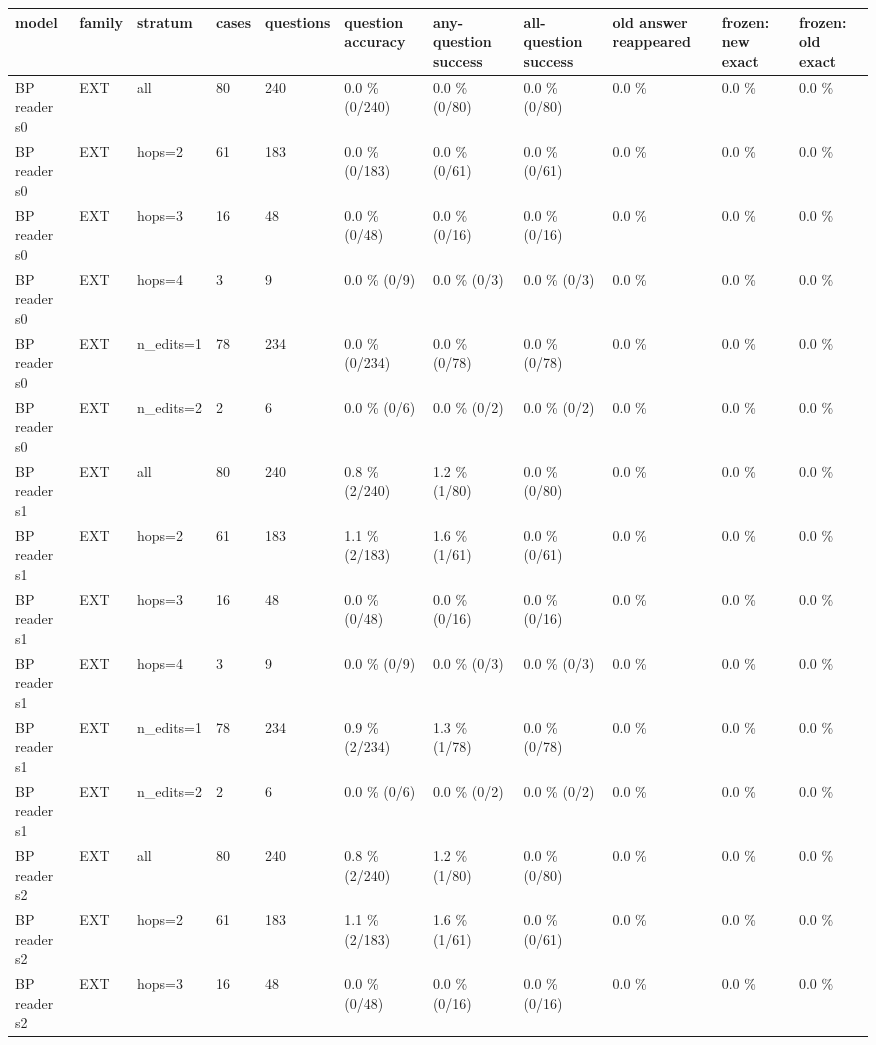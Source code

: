 \documentclass[10pt,a4paper]{article}
\begin{document}
\begin{center}\tiny
\begin{tabularx}{\textwidth}{@{}p{}XXXXXXXXXX@{}}
\toprule
model & family & stratum & cases & questions & question accuracy & any-question success & all-question success & old answer reappeared & frozen: new exact & frozen: old exact \\ \midrule
BP reader s0 & EXT & all & 80 & 240 & 0.0 \% (0/240) & 0.0 \% (0/80) & 0.0 \% (0/80) & 0.0 \% & 0.0 \% & 0.0 \% \\
BP reader s0 & EXT & hops=2 & 61 & 183 & 0.0 \% (0/183) & 0.0 \% (0/61) & 0.0 \% (0/61) & 0.0 \% & 0.0 \% & 0.0 \% \\
BP reader s0 & EXT & hops=3 & 16 & 48 & 0.0 \% (0/48) & 0.0 \% (0/16) & 0.0 \% (0/16) & 0.0 \% & 0.0 \% & 0.0 \% \\
BP reader s0 & EXT & hops=4 & 3 & 9 & 0.0 \% (0/9) & 0.0 \% (0/3) & 0.0 \% (0/3) & 0.0 \% & 0.0 \% & 0.0 \% \\
BP reader s0 & EXT & n\_edits=1 & 78 & 234 & 0.0 \% (0/234) & 0.0 \% (0/78) & 0.0 \% (0/78) & 0.0 \% & 0.0 \% & 0.0 \% \\
BP reader s0 & EXT & n\_edits=2 & 2 & 6 & 0.0 \% (0/6) & 0.0 \% (0/2) & 0.0 \% (0/2) & 0.0 \% & 0.0 \% & 0.0 \% \\
BP reader s1 & EXT & all & 80 & 240 & 0.8 \% (2/240) & 1.2 \% (1/80) & 0.0 \% (0/80) & 0.0 \% & 0.0 \% & 0.0 \% \\
BP reader s1 & EXT & hops=2 & 61 & 183 & 1.1 \% (2/183) & 1.6 \% (1/61) & 0.0 \% (0/61) & 0.0 \% & 0.0 \% & 0.0 \% \\
BP reader s1 & EXT & hops=3 & 16 & 48 & 0.0 \% (0/48) & 0.0 \% (0/16) & 0.0 \% (0/16) & 0.0 \% & 0.0 \% & 0.0 \% \\
BP reader s1 & EXT & hops=4 & 3 & 9 & 0.0 \% (0/9) & 0.0 \% (0/3) & 0.0 \% (0/3) & 0.0 \% & 0.0 \% & 0.0 \% \\
BP reader s1 & EXT & n\_edits=1 & 78 & 234 & 0.9 \% (2/234) & 1.3 \% (1/78) & 0.0 \% (0/78) & 0.0 \% & 0.0 \% & 0.0 \% \\
BP reader s1 & EXT & n\_edits=2 & 2 & 6 & 0.0 \% (0/6) & 0.0 \% (0/2) & 0.0 \% (0/2) & 0.0 \% & 0.0 \% & 0.0 \% \\
BP reader s2 & EXT & all & 80 & 240 & 0.8 \% (2/240) & 1.2 \% (1/80) & 0.0 \% (0/80) & 0.0 \% & 0.0 \% & 0.0 \% \\
BP reader s2 & EXT & hops=2 & 61 & 183 & 1.1 \% (2/183) & 1.6 \% (1/61) & 0.0 \% (0/61) & 0.0 \% & 0.0 \% & 0.0 \% \\
BP reader s2 & EXT & hops=3 & 16 & 48 & 0.0 \% (0/48) & 0.0 \% (0/16) & 0.0 \% (0/16) & 0.0 \% & 0.0 \% & 0.0 \% \\

\end{tabularx}
\end{center}
\end{document}
